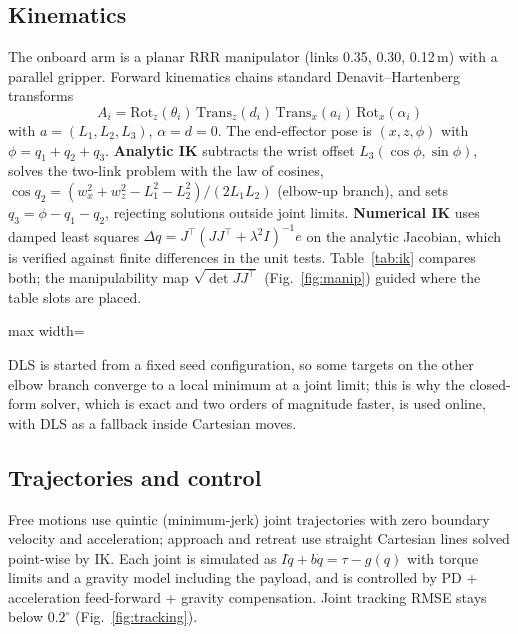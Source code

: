 \documentclass[11pt,a4paper]{article}
\newcommand{\fit}[1]{\begin{adjustbox}{max width=\linewidth}\end{adjustbox}}
\begin{document}
\subsection{Kinematics}
The onboard arm is a planar RRR manipulator (links 0.35, 0.30, 0.12\,m) with a parallel gripper.
Forward kinematics chains standard Denavit--Hartenberg transforms
\[A_i=\mathrm{Rot}_z(\theta_i)\,\mathrm{Trans}_z(d_i)\,\mathrm{Trans}_x(a_i)\,\mathrm{Rot}_x(\alpha_i)\]
with $a=(L_1,L_2,L_3)$, $\alpha=d=0$. The end-effector pose is $(x,z,\phi)$ with $\phi=q_1+q_2+q_3$.
\textbf{Analytic IK} subtracts the wrist offset $L_3(\cos\phi,\sin\phi)$, solves the two-link
problem with the law of cosines, $\cos q_2=(w_x^2+w_z^2-L_1^2-L_2^2)/(2L_1L_2)$ (elbow-up branch), and
sets $q_3=\phi-q_1-q_2$, rejecting solutions outside joint limits. \textbf{Numerical IK} uses damped
least squares $\Delta q=J^\top(JJ^\top+\lambda^2I)^{-1}e$ on the analytic Jacobian, which is verified
against finite differences in the unit tests. Table~\ref{tab:ik} compares both; the manipulability map
$\sqrt{\det JJ^\top}$ (Fig.~\ref{fig:manip}) guided where the table slots are placed.
\begin{table}[H]\centering\small\caption{IK solvers on 2000 random reachable poses.}\label{tab:ik}
\fit{tab_ik}\end{table}
DLS is started from a fixed seed configuration, so some targets on the other elbow branch converge to
a local minimum at a joint limit; this is why the closed-form solver, which is exact and two orders of
magnitude faster, is used online, with DLS as a fallback inside Cartesian moves.

\subsection{Trajectories and control}
Free motions use quintic (minimum-jerk) joint trajectories with zero boundary velocity and
acceleration; approach and retreat use straight Cartesian lines solved point-wise by IK. Each joint is
simulated as $I\ddot q+b\dot q=\tau-g(q)$ with torque limits and a gravity model including the
payload, and is controlled by PD + acceleration feed-forward + gravity compensation. Joint tracking RMSE
stays below $0.2^\circ$ (Fig.~\ref{fig:tracking}).
\end{document}

